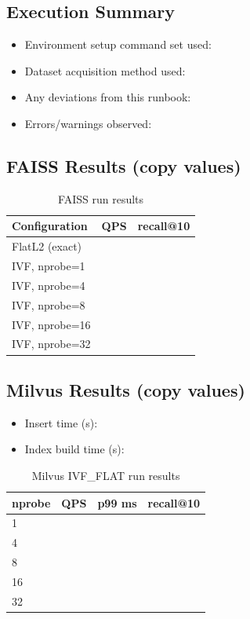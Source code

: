 \documentclass[11pt,a4paper]{article}
\begin{document}
\subsection*{Execution Summary}
\begin{itemize}[leftmargin=*]
  \item Environment setup command set used:
  \item Dataset acquisition method used:
  \item Any deviations from this runbook:
  \item Errors/warnings observed:
\end{itemize}

\subsection*{FAISS Results (copy values)}
\begin{table}[h]
\centering
\caption{FAISS run results}
\begin{tabular}{@{}lrr@{}}
\toprule
\textbf{Configuration} & \textbf{QPS} & \textbf{recall@10} \\
\midrule
FlatL2 (exact) &  &  \\
IVF, nprobe=1  &  &  \\
IVF, nprobe=4  &  &  \\
IVF, nprobe=8  &  &  \\
IVF, nprobe=16 &  &  \\
IVF, nprobe=32 &  &  \\
\bottomrule
\end{tabular}
\end{table}

\subsection*{Milvus Results (copy values)}
\begin{itemize}[leftmargin=*]
  \item Insert time (s):
  \item Index build time (s):
\end{itemize}

\begin{table}[h]
\centering
\caption{Milvus IVF\_FLAT run results}
\begin{tabular}{@{}lrrr@{}}
\toprule
\textbf{nprobe} & \textbf{QPS} & \textbf{p99 ms} & \textbf{recall@10} \\
\midrule
1  &  &  &  \\
4  &  &  &  \\
8  &  &  &  \\
16 &  &  &  \\
32 &  &  &  \\
\bottomrule
\end{tabular}
\end{table}
\end{document}
